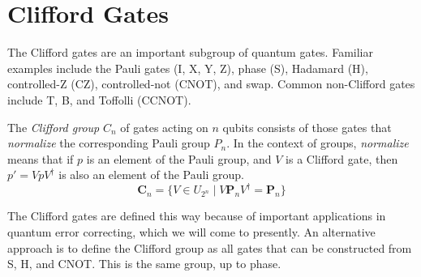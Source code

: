 
\clearpage


\section{Clifford Gates}
The Clifford gates are an important subgroup of quantum gates. Familiar examples include the Pauli gates (I, X, Y, Z), phase (S), Hadamard (H), controlled-Z (CZ), controlled-not (CNOT), and swap.  Common non-Clifford gates include T, B, and Toffolli (CCNOT). 

The {\sl Clifford group}  $C_n$ of gates acting on $n$ qubits consists of those gates that {\sl normalize} the corresponding Pauli group $P_n$. In the context of groups, {\sl normalize} means that if $p$ is an element of the Pauli group, and $V$ is a Clifford gate, then $p' = V p V^\dagger$ is also an element of the Pauli group.
\[
\mathbf{C}_n=\{V\in U_{2^n}\mid V\mathbf{P}_nV^\dagger = \mathbf{P}_n\}
\]

The Clifford gates are defined this way because of important applications in quantum  error correcting, which we will come to presently.
An alternative approach is to define the Clifford group as all gates that can be constructed from S, H, and CNOT. This is the same group, up to phase. 



